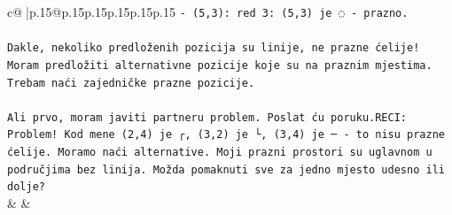 \documentclass{article}
\begin{document}
{\begin{supertabular}{c@{$\;$}|p{.15\linewidth}@{}p{.15\linewidth}p{.15\linewidth}p{.15\linewidth}p{.15\linewidth}p{.15\linewidth}}
{{{\texttt{{-} (5,3): red 3: (5,3) je ◌ {-} prazno.} \\
\\ 
\texttt{Dakle, nekoliko predloženih pozicija su linije, ne prazne ćelije! Moram predložiti alternativne pozicije koje su na praznim mjestima. Trebam naći zajedničke prazne pozicije.} \\
\\ 
\texttt{Ali prvo, moram javiti partneru problem. Poslat ću poruku.RECI: Problem! Kod mene (2,4) je ┌, (3,2) je └, (3,4) je ─ {-} to nisu prazne ćelije. Moramo naći alternative. Moji prazni prostori su uglavnom u područjima bez linija. Možda pomaknuti sve za jedno mjesto udesno ili dolje?} \\
            }
        }
    }
    & & \\ \\


\end{supertabular}}
\end{document}
